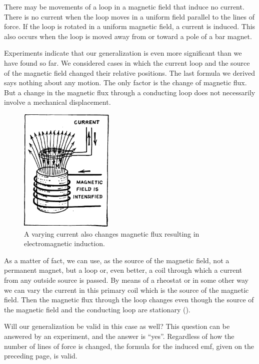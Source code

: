 There may be movements of a loop in a magnetic field that induce no current. There is no current when the loop moves in a uniform field parallel to the lines
of force. If the loop is rotated in a uniform magnetic field, a current is induced. This also occurs when the loop is moved away from or toward a pole of a bar magnet.

Experiments indicate that our generalization is even more significant than we have found so far. We considered cases in which the current loop and the source of the magnetic field changed their relative positions. The last formula we derived says nothing about any motion. The only factor is the change of magnetic flux. But a change in the magnetic flux through a conducting loop does not necessarily involve a mechanical displacement.

\begin{figure}[!ht]
\centering
\includegraphics[width=0.4\textwidth]{figures/fig-03-08.pdf}
\caption{A varying current also changes magnetic flux resulting in electromagnetic induction.}
\label{fig-3.8}
\end{figure}

As a matter of fact, we can use, as the source of the magnetic field, not a permanent magnet, but a loop or, even better, a coil through which a current from any outside source is passed. By means of a rheostat or in some other way we can vary the current in this primary coil which is the source of the magnetic field. Then the magnetic flux through the loop changes even though the source of the magnetic field and the conducting loop are stationary ().


Will our generalization be valid in this case as well? This question can be answered by an experiment, and the answer is ``yes''. Regardless of how the number of lines of force is changed, the formula for the induced emf, given on the preceding page, is valid.


